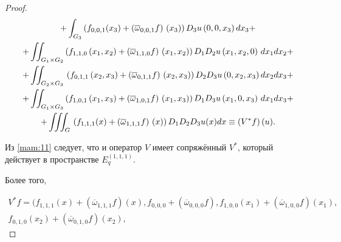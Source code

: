\begin{proof}
\begin{multline}
{+\int_{G_3 }\left( f_{0, 0, 1}( x_3) +\left( \overline{\omega

}_{0, 0, 1}f\right) \,( x_3) \right) D_3 u\left(

0, 0, x_3 \right) dx_3 +}%

\\

{+\iint_{G_1 \times G_2 }\left( f_{1, 1, 0}\left(

x_1 ,x_2 \right) +\left( \overline{\omega }_{1, 1, 0}f\right) \,\left(

x_1 ,x_2 \right) \right) D_1 D_2 u\left( x_1 ,x_2 , 0\right)

\,dx_1 dx_2 +}

\\

{+\iint_{G_2 \times G_3 }\,\left( f_{0, 1, 1}\left(

x_2 ,x_3 \right) +\left( \overline{\omega }_{0, 1, 1}f\right) \,\left(

x_2 ,x_3 \right) \right) D_2 D_3 u\left( 0, x_2 , x_3 \right)

dx_2 dx_3 +}%

\\

{+\iint_{G_1 \times G_3 }\left( f_{1, 0, 1}\left(

x_1 ,x_3 \right) +\left( \overline{\omega }_{1, 0, 1}f\right) \,\left(

x_1 ,x_3 \right) \right) D_1 D_3 u\left( x_1 ,0,x_3 \right)

\,dx_1 dx_3 +} \\

{+\iiint_{G}\,\left( f_{1, 1, 1}(x) +\left( \overline{%

\omega }_{1, 1, 1}f\right) \,(x) \right)D_1D_2D_3u(x) dx\equiv \left( V^{\ast }f\right) (u).}

\end{multline}



Из \eqref{mam:11} следует, что и оператор $V$ имеет сопряжённый $V^{\ast}$, который действует в пространстве $E_{q}^{(1, 1, 1)}$. 

Более того,

\begin{multline*}

V^{\ast }f=\big( f_{1, 1, 1}(x)+( \overline{\omega }_{1, 1, 1}f ) (x), f_{0, 0, 0}+( \overline{\omega }_{0, 0, 0}f), 

f_{1, 0, 0}( x_1) + ( \overline{\omega }_{1, 0, 0}f ) ( x_1), \\ f_{0, 1, 0}(x_2) + ( \overline{\omega }_{0,1,0}f) (x_2) , 


\end{multline*}
\end{proof}
